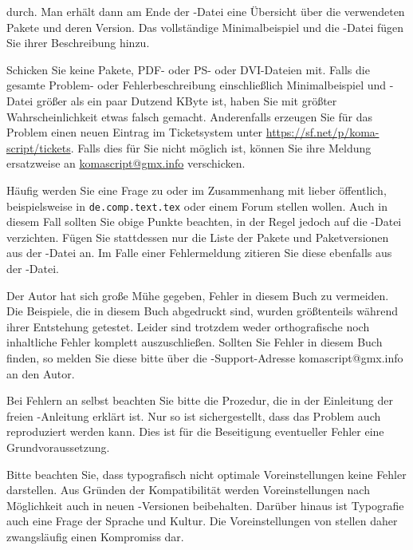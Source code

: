 {\begin{itemize}
    durch. Man erhält dann am Ende der -Datei eine Übersicht über
    die verwendeten Pakete und deren Version. Das vollständige Minimalbeispiel
    und die -Datei fügen Sie ihrer Beschreibung hinzu.
  \end{itemize}
  Schicken Sie keine Pakete, PDF- oder PS- oder DVI-Dateien mit.  Falls die
  gesamte Problem- oder Fehlerbeschreibung einschließlich Minimalbeispiel und
  -Datei größer als ein paar Dutzend KByte ist, haben Sie mit
  größter Wahrscheinlichkeit etwas falsch gemacht. Anderenfalls erzeugen Sie
  für das Problem einen neuen Eintrag im Ticketsystem unter
  \url{https://sf.net/p/koma-script/tickets}. Falls dies für Sie nicht möglich
  ist, können Sie ihre Meldung ersatzweise an
  \href{mailto:komascript@gmx.info}{komascript@gmx.info} verschicken.

  Häufig werden Sie eine Frage zu \KOMAScript{} oder im Zusammenhang mit
  \KOMAScript{} lieber öffentlich, beispielsweise in \texttt{de.comp.text.tex}
  oder einem Forum stellen wollen. Auch in diesem Fall sollten Sie obige
  Punkte beachten, in der Regel jedoch auf die -Datei
  verzichten. Fügen Sie stattdessen nur die Liste der Pakete und
  Paketversionen aus der -Datei an. Im Falle einer Fehlermeldung
  zitieren Sie diese ebenfalls aus der -Datei.%
}{%
  Der Autor hat sich große Mühe gegeben, Fehler in diesem Buch zu
  vermeiden. Die Beispiele, die in diesem Buch abgedruckt sind, wurden
  größtenteils während ihrer Entstehung getestet. Leider sind trotzdem weder
  orthografische noch inhaltliche Fehler komplett auszuschließen. Sollten Sie
  Fehler in diesem Buch finden, so melden Sie diese bitte über die
  \KOMAScript-Support-Adresse \mbox{komascript@gmx.info} an den Autor.

  Bei Fehlern an \KOMAScript{} selbst beachten Sie bitte die Prozedur, die in
  der Einleitung der freien \KOMAScript-Anleitung erklärt ist. Nur so ist
  sichergestellt, dass das Problem auch reproduziert werden kann. Dies ist
  für die Beseitigung eventueller Fehler eine Grundvoraussetzung.%
}

Bitte beachten Sie, dass typografisch nicht optimale Voreinstellungen keine
Fehler darstellen. Aus Gründen der Kompatibilität werden Voreinstellungen nach
Möglichkeit auch in neuen \KOMAScript-Versionen beibehalten. Darüber hinaus
ist Typografie auch eine Frage der Sprache und Kultur. Die Voreinstellungen
von \KOMAScript{} stellen daher zwangsläufig einen Kompromiss dar.

